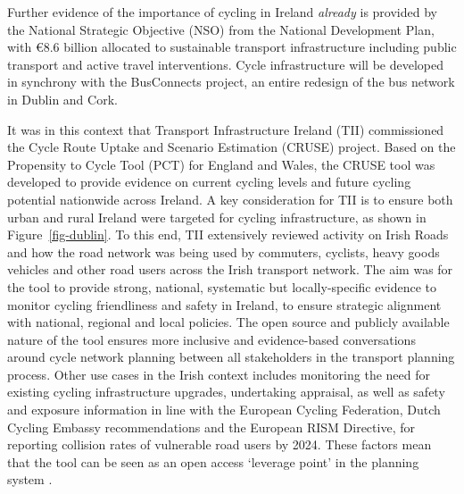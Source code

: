 \documentclass[
  super,
  preprint,
  3p]{elsarticle}
\begin{document}
Further evidence of the importance of cycling in Ireland \emph{already}
is provided by the National Strategic Objective (NSO) from the National
Development Plan, with €8.6 billion allocated to sustainable transport
infrastructure including public transport and active travel
interventions. Cycle infrastructure will be developed in synchrony with
the BusConnects project, an entire redesign of the bus network in Dublin
and Cork.

It was in this context that Transport Infrastructure Ireland (TII)
commissioned the Cycle Route Uptake and Scenario Estimation (CRUSE)
project. Based on the Propensity to Cycle Tool (PCT) for England and
Wales, the CRUSE tool was developed to provide evidence on current
cycling levels and future cycling potential nationwide across Ireland. A
key consideration for TII is to ensure both urban and rural Ireland were
targeted for cycling infrastructure, as shown in
Figure~\ref{fig-dublin}. To this end, TII extensively reviewed activity
on Irish Roads and how the road network was being used by commuters,
cyclists, heavy goods vehicles and other road users across the Irish
transport network. The aim was for the tool to provide strong, national,
systematic but locally-specific evidence to monitor cycling friendliness
and safety in Ireland, to ensure strategic alignment with national,
regional and local policies. The open source and publicly available
nature of the tool ensures more inclusive and evidence-based
conversations around cycle network planning between all stakeholders in
the transport planning process. Other use cases in the Irish context
includes monitoring the need for existing cycling infrastructure
upgrades, undertaking appraisal, as well as safety and exposure
information in line with the European Cycling Federation, Dutch Cycling
Embassy recommendations and the European RISM Directive, for reporting
collision rates of vulnerable road users by 2024. These factors mean
that the tool can be seen as an open access `leverage point' in the
planning system \citep{lovelace2020}.
\end{document}

